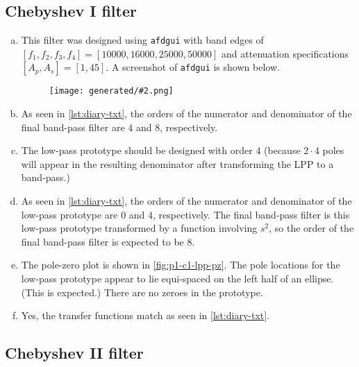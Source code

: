 \documentclass{ajhlabreport}
\newcommand{\generatedfigw}[2]{
	\texttt{[image: generated/\#2.png]}
}
\begin{document}
\newpage
\subsection{Chebyshev I filter}%

\begin{enumerate}[(a)]
%
\item This filter was designed using \texttt{afdgui} with band edges of $[ f_1,
f_2, f_3, f_4 ] = [ 10000, 16000, 25000, 50000 ]$ and attenuation specifications
$[ A_p, A_s ] = [ 1, 45 ]$. A screenshot of \texttt{afdgui} is shown below.
\begin{figure}[H]\centering\generatedfigw{0.8}{p1a-c1}\end{figure}
%
\item As seen in \autoref{lst:diary-txt}, the orders of the numerator and
denominator of the final band-pass filter are $4$ and $8$, respectively.
%
\item The low-pass prototype should be designed with order $4$ (because $2 \cdot
4$ poles will appear in the resulting denominator after transforming the LPP to
a band-pass.)
%
\item As seen in \autoref{lst:diary-txt}, the orders of the numerator and
denominator of the low-pass prototype are $0$ and $4$, respectively. The final
band-pass filter is this low-pass prototype transformed by a function involving
$s^2$, so the order of the final band-pass filter is expected to be $8$.
%
\item The pole-zero plot is shown in \autoref{fig:p1-c1-lpp-pz}. The pole
locations for the low-pass prototype appear to lie equi-spaced on the left half
of an ellipse. (This is expected.) There are no zeroes in the prototype.
%
\setcounter{enumi}{6}
\item Yes, the transfer functions match as seen in \autoref{lst:diary-txt}.
%
\end{enumerate}


\newpage
\subsection{Chebyshev II filter}%
\end{document}
